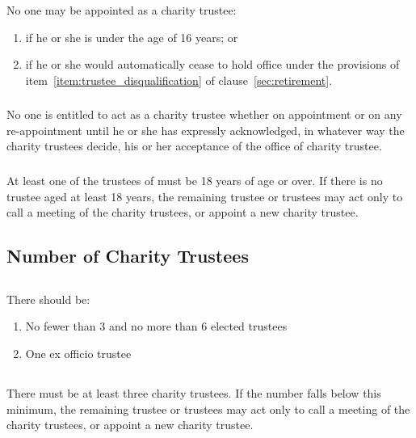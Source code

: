         \subsubsection{}
        No one may be appointed as a charity trustee:
        \begin{enumerate}
            \item if he or she is under the age of 16 years; or
            \item if he or she would automatically cease to hold office under the provisions of item~\ref{item:trustee_disqualification} of clause~\ref{sec:retirement}.
        \end{enumerate}

        \subsubsection{}
        No one is entitled to act as a charity trustee whether on appointment or on any re-appointment until he or she has expressly acknowledged, in whatever way the charity trustees decide, his or her acceptance of the office of charity trustee.

        \subsubsection{}
        At least one of the trustees of \shortname{} must be 18 years of age or over. If there is no trustee aged at least 18 years, the remaining trustee or trustees may act only to call a meeting of the charity trustees, or appoint a new charity trustee.

    \subsection{Number of Charity Trustees}\label{sec:trustee_numbers}

        \subsection{}\label{sec:min_max}
        There should be:
        \begin{enumerate}
            \item No fewer than 3 and no more than 6 elected trustees
            \item One ex officio trustee
        \end{enumerate}

        \subsection{}
        There must be at least three charity trustees. If the number falls below this minimum, the remaining trustee or trustees may act only to call a meeting of the charity trustees, or appoint a new charity trustee.


